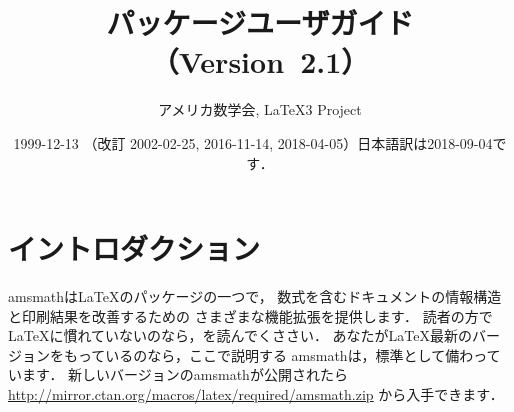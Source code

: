 \documentclass[leqno,titlepage,openany]{amsldoc}[1999/12/13]
\title{\nipkg{amsmath}パッケージユーザガイド（Version~2.1）}
\author{アメリカ数学会, \LaTeX3 Project}
\date{1999-12-13 （改訂 2002-02-25, 2016-11-14, 2018-04-05）日本語訳は2018-09-04です．}
\makeatletter
\let\cleardouble@page\cleardoublepage
\def\cleardoublepage{\clearpage{\pagestyle{empty}\cleardouble@page}}
\newcommand{\nipkg}{\textsf}
\makeatother
\begin{document}
\frontmatter

\maketitle

\pagestyle{headings}
\tableofcontents
\cleardoublepage %

\mainmatter
\chapter{イントロダクション}


\nipkg{amsmath}は\LaTeX{}のパッケージの一つで，
数式を含むドキュメントの情報構造と印刷結果を改善するための
さまざまな機能拡張を提供します．
読者の方で\LaTeX{}に慣れていないのなら，\cite{lamport}を読んでくささい．
あなたが\LaTeX{}最新のバージョンをもっているのなら，ここで説明する
\nipkg{amsmath}は，標準として備わっています．
新しいバージョンの\nipkg{amsmath}が公開されたら
\url{http://mirror.ctan.org/macros/latex/required/amsmath.zip}
から入手できます．
\end{document}
